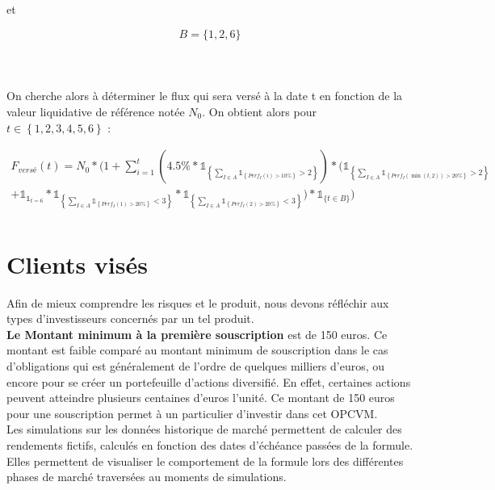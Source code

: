 \documentclass[french,12pt,a4paper]{article}
\begin{document}
\noindent et

\[ B = \{1,2,6\} \]\\
\\
\\
On cherche alors à déterminer le flux qui sera versé à la date t en fonction de la valeur liquidative de référence notée $N_{0}$.
On obtient alors pour $t \in \left\lbrace 1,2,3,4,5,6 \right\rbrace$ :

\begin{multline*}

  F_{versé}(t) = N_{0}*(1+ \sum_{i=1}^{t}(4.5\%*\mathds{1}_{\left\lbrace \sum_{I \in A} \mathds{1}_{\left\lbrace Perf_{I}(i)>10\% \right\rbrace}>2 \right\rbrace}) * (\mathds{1}_{\left\lbrace \sum_{I \in A} \mathds{1}_{\left\lbrace Perf_{I}(\min{(t,2)})>20\% \right\rbrace}>2 \right\rbrace}\\ 
  + \mathds{1}_{\mathds{1}_{t=6}}*\mathds{1}_{\left\lbrace \sum_{I \in A} \mathds{1}_{\left\lbrace Perf_{I}(1)>20\% \right\rbrace}<3 \right\rbrace}*\mathds{1}_{\left\lbrace \sum_{I \in A} \mathds{1}_{\left\lbrace Perf_{I}(2)>20\% \right\rbrace}<3 \right\rbrace})*\mathds{1}_{\{t \in B\}}) \\
  
\end{multline*}

\section{Clients visés}

Afin de mieux comprendre les risques et le produit, nous devons réfléchir aux types d'investisseurs concernés par un tel produit.\\

\indent \textbf{Le Montant minimum à la première souscription} est de 150 euros. Ce montant est faible comparé au montant minimum de souscription dans le cas d'obligations qui est généralement de l'ordre de quelques milliers d'euros, ou encore pour se créer un portefeuille d'actions diversifié. En effet, certaines actions peuvent atteindre plusieurs centaines d'euros l'unité. Ce montant de 150 euros pour une souscription permet à un particulier d'investir dans cet OPCVM.\\
\indent Les simulations sur les données historique de marché permettent de calculer des rendements fictifs, calculés en fonction des dates d'échéance passées de la formule. Elles permettent de visualiser le comportement de la formule lors des différentes phases de marché traversées au moments de simulations.\\
\end{document}
